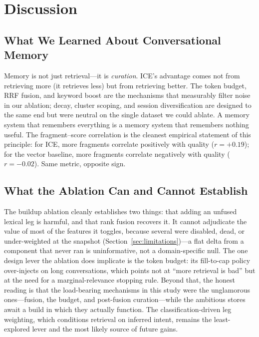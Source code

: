 \documentclass[10pt]{article}
\begin{document}
\section{Discussion}
\label{sec:discussion}

\subsection{What We Learned About Conversational Memory}

Memory is not just retrieval---it is \emph{curation}. ICE's advantage comes not from retrieving more (it retrieves less) but from retrieving better. The token budget, RRF fusion, and keyword boost are the mechanisms that measurably filter noise in our ablation; decay, cluster scoping, and session diversification are designed to the same end but were neutral on the single dataset we could ablate. A memory system that remembers everything is a memory system that remembers nothing useful. The fragment--score correlation is the cleanest empirical statement of this principle: for ICE, more fragments correlate positively with quality ($r = +0.19$); for the vector baseline, more fragments correlate negatively with quality ($r = -0.02$). Same metric, opposite sign.

\subsection{What the Ablation Can and Cannot Establish}

The buildup ablation cleanly establishes two things: that adding an unfused lexical leg is harmful, and that rank fusion recovers it. It cannot adjudicate the value of most of the features it toggles, because several were disabled, dead, or under-weighted at the snapshot (Section~\ref{sec:limitations})---a flat delta from a component that never ran is uninformative, not a domain-specific null. The one design lever the ablation does implicate is the token budget: its fill-to-cap policy over-injects on long conversations, which points not at ``more retrieval is bad'' but at the need for a marginal-relevance stopping rule. Beyond that, the honest reading is that the load-bearing mechanisms in this study were the unglamorous ones---fusion, the budget, and post-fusion curation---while the ambitious stores await a build in which they actually function. The classification-driven leg weighting, which conditions retrieval on inferred intent, remains the least-explored lever and the most likely source of future gains.
\end{document}
